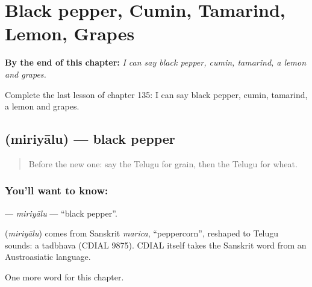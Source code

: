 
\chapter{Black pepper, Cumin, Tamarind, Lemon, Grapes}
\label{ch:te-black-pepper-cumin-tamarind-lemon-grapes}

\begin{chapteropening}
\textbf{By the end of this chapter:} \emph{I can say black pepper, cumin, tamarind, a lemon and grapes.}

Complete the last lesson of chapter 135: I can say black pepper, cumin, tamarind, a lemon and grapes.
\end{chapteropening}

\section[\texorpdfstring{\te{మిరియాలు} (miriyālu)}{మిరియాలు (miriyālu)}]{ (miriyālu) — black pepper}

\label{lesson:TE-C135-miriyalu}



\begin{quote}
Before the new one: say the Telugu for grain, then the Telugu for wheat.
\end{quote}

\subsection*{You'll want to know: }
\textbf{} — \emph{miriyālu} — \textquotedblleft{}black pepper\textquotedblright{}.

\begin{cousinweb}
\textbf{} (\emph{miriyālu}) comes from Sanskrit \emph{marica}, \textquotedblleft{}peppercorn\textquotedblright{}, reshaped to Telugu sounds: a tadbhava (CDIAL 9875). CDIAL itself takes the Sanskrit word from an Austroasiatic language.
\end{cousinweb}

\begin{grammarlens}[title={What you've built}]
One more word for this chapter.
\end{grammarlens}

